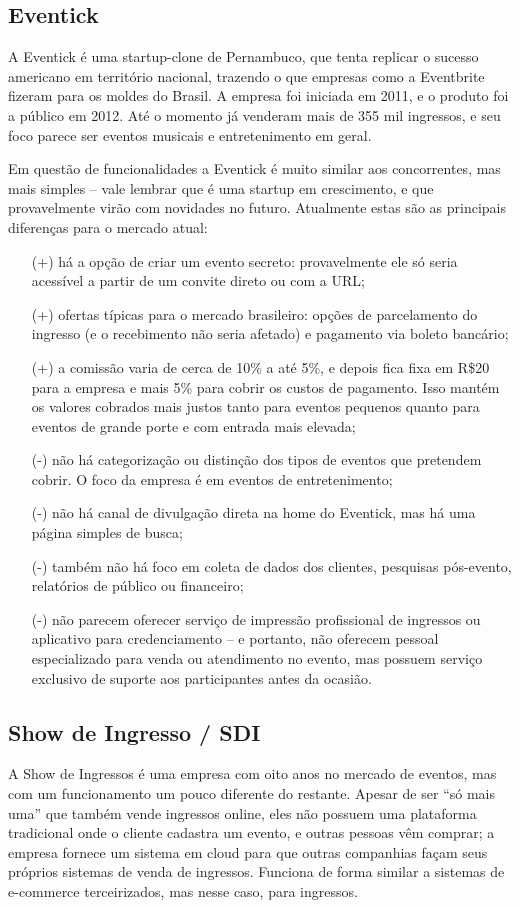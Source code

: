 \documentclass[12pt,a4paper,twoside,hyphens,english,brazil]{abntex2}
\begin{document}
\subsection{Eventick}
A Eventick é uma startup-clone de Pernambuco, que tenta replicar o sucesso americano em território nacional, trazendo o que empresas como a Eventbrite fizeram para os moldes do Brasil. A empresa foi iniciada em 2011, e o produto foi a público em 2012.\cite{eventick-startupi} Até o momento já venderam mais de 355 mil ingressos\cite{eventick-home}, e seu foco parece ser eventos musicais e entretenimento em geral.

Em questão de funcionalidades a Eventick é muito similar aos concorrentes, mas mais simples -- vale lembrar que é uma startup em crescimento, e que provavelmente virão com novidades no futuro. Atualmente estas são as principais diferenças para o mercado atual:
\begin{itemize}[itemsep=-0.5ex]
	\item[(+)] há a opção de criar um evento secreto: provavelmente ele só seria acessível a partir de um convite direto ou com a URL;
	\item[(+)] ofertas típicas para o mercado brasileiro: opções de parcelamento do ingresso (e o recebimento não seria afetado) e pagamento via boleto bancário;
	\item[(+)] a comissão varia de cerca de 10\% a até 5\%, e depois fica fixa em R\$20 para a empresa e mais 5\% para cobrir os custos de pagamento. Isso mantém os valores cobrados mais justos tanto para eventos pequenos quanto para eventos de grande porte e com entrada mais elevada;
	\item[(-)] não há categorização ou distinção dos tipos de eventos que pretendem cobrir. O foco da empresa é em eventos de entretenimento;
	\item[(-)] não há canal de divulgação direta na home do Eventick, mas há uma página simples de busca;
	\item[(-)] também não há foco em coleta de dados dos clientes, pesquisas pós-evento, relatórios de público ou financeiro;
	\item[(-)] não parecem oferecer serviço de impressão profissional de ingressos ou aplicativo para credenciamento -- e portanto, não oferecem pessoal especializado para venda ou atendimento no evento, mas possuem serviço exclusivo de suporte aos participantes antes da ocasião.
\end{itemize}

\subsection{Show de Ingresso / SDI}
\label{sec:show-de-ingresso}
A Show de Ingressos é uma empresa com oito anos no mercado de eventos, mas com um funcionamento um pouco diferente do restante. Apesar de ser ``só mais uma'' que também vende ingressos online, eles não possuem uma plataforma tradicional onde o cliente cadastra um evento, e outras pessoas vêm comprar; a empresa fornece um sistema em cloud para que outras companhias façam seus próprios sistemas de venda de ingressos. Funciona de forma similar a sistemas de e-commerce terceirizados, mas nesse caso, para ingressos.
\end{document}
